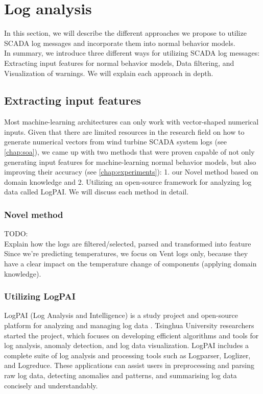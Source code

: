 \section{Log analysis}
In this section, we will describe the different approaches we propose to utilize SCADA log messages and incorporate them into normal behavior models.\\
In summary, we introduce three different ways for utilizing SCADA log messages: Extracting input features for normal behavior models, Data filtering, and Visualization of warnings.
We will explain each approach in depth.

\subsection{Extracting input features}
  Most machine-learning architectures can only work with vector-shaped numerical inputs. Given that there are limited resources in the research field on how to generate 
  numerical vectors from wind turbine SCADA system logs (see \ref{chap:soa}), we came up with two methods that were proven capable of not only generating input features for 
  machine-learning normal behavior models, but also improving their accuracy (see \ref{chap:experiments}): 1. our Novel method based on domain knowledge and 
  2. Utilizing an open-source framework for analyzing log data called LogPAI. We will discuss each method in detail.

  \subsubsection{Novel method}
    TODO:\\
    Explain how the logs are filtered/selected, parsed and transformed into feature\\
    Since we're predicting temperatures, we focus on Vent logs only, because they have a clear impact on the temperature change of components (applying domain knowledge).\\

  \subsubsection{Utilizing LogPAI}
    LogPAI (Log Analysis and Intelligence) is a study project and open-source platform for analyzing and managing log data \cite{LogPAI}. 
    Tsinghua University researchers started the project, which focuses on developing efficient algorithms and tools for log analysis, anomaly detection, and log data visualization.
    LogPAI includes a complete suite of log analysis and processing tools such as Logparser, Loglizer, and Logreduce. 
    These applications can assist users in preprocessing and parsing raw log data, detecting anomalies and patterns, and summarising log data concisely and understandably.\\

